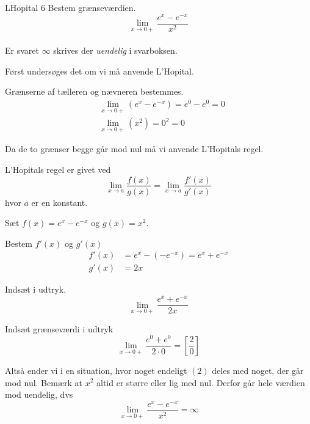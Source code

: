 \documentclass{article}
\begin{document}
\begin{exercise}{LHopital 6}
	Bestem grænseværdien.
	\[
	\lim_{x \to 0+} \frac{e^x - e^{-x}}{x^2}
	\] 
	\\
	Er svaret $\infty$ skrives der \emph{uendelig} i svarboksen.
	
	
	\hint
	Først undersøges det om vi må anvende L'Hopital.
	
	\hint
	Grænserne af tælleren og nævneren bestemmes.
	\begin{align*}
		&\lim_{x \to 0+} (e^x - e^{-x}) = e^0 - e^0 = 0 \\
		&\lim_{x \to 0+} (x^2)  = 0^2  = 0
	\end{align*}
	
	\hint
	Da de to grænser begge går mod nul må vi  anvende L'Hopitals regel. 
	
	\hint
	L'Hopitals regel er givet ved
	\[
	\lim_{x \to a} \frac{f(x)}{g(x)} = \lim_{x \to a} \frac{f'(x)}{g'(x)} 
	\]
	hvor $a$  er en konstant.
	
	\hint
	Sæt $f(x) = e^x - e^{-x} $ og $g(x) = x^2$. 
	
	\hint
	Bestem $f'(x)$ og $g'(x)$
	\begin{align*}
		f'(x) &= e^x - \left(- e^{-x} \right) = e^x + e^{-x} \\
		g'(x) &= 2x
	\end{align*}
	
	\hint
	Indsæt i udtryk. 
	\[
	\lim_{x \to 0+} \frac{e^x + e^{-x}}{2x} 
	\]
	
	\hint
	Indsæt grænseværdi i udtryk
	\[
	\lim_{x \to 0+} \frac{e^0 + e^0}{2 \cdot 0}  = \left[ \frac{2}{0}  \right] 
	\]
	
	\hint 
	Altså ender vi i en situation, hvor noget endeligt $(2)$ deles med noget, der går mod nul. Bemærk at $x^2$ altid er større eller lig med nul. Derfor går hele værdien mod uendelig, dvs
	\[
	\lim_{x \to 0+} \frac{e^x - e^{-x}}{x^2} = \infty
	\]
	
\end{exercise}
\end{document}

